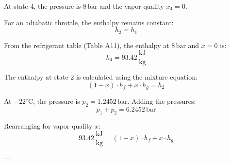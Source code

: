 At state 4, the pressure is \( 8 \, \text{bar} \) and the vapor quality \( x_4 = 0 \).  

For an adiabatic throttle, the enthalpy remains constant:  
\[
h_2 = h_1
\]  

From the refrigerant table (Table A11), the enthalpy at \( 8 \, \text{bar} \) and \( x = 0 \) is:  
\[
h_4 = 93.42 \, \frac{\text{kJ}}{\text{kg}}
\]  

The enthalpy at state 2 is calculated using the mixture equation:  
\[
(1-x) \cdot h_f + x \cdot h_g = h_2
\]  

At \( -22^\circ\text{C} \), the pressure is \( p_2 = 1.2452 \, \text{bar} \). Adding the pressures:  
\[
p_1 + p_2 = 6.2452 \, \text{bar}
\]  

Rearranging for vapor quality \( x \):  
\[
93.42 \, \frac{\text{kJ}}{\text{kg}} = (1-x) \cdot h_f + x \cdot h_g
\]  

---